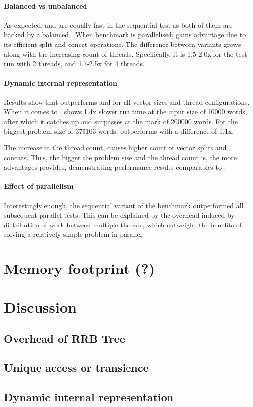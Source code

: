 \paragraph*{Balanced vs unbalanced}
As expected, \rbvec{} and \rrbvec{} are equally fast in the sequential test as both of them are backed by a balanced \rbtree{}. When benchmark is parallelised, \rrbvec{} gains advantage due to its efficient split and concat operations. The difference between variants grows along with the increasing count of threads. Specifically, it is 1.5-2.0x for the test run with 2 threads, and 1.7-2.5x for 4 threads.

\paragraph*{Dynamic internal representation}
Results show that \pvec{} outperforms \rbvec{} and \rrbvec{} for all vector sizes and thread configurations. When it comes to \stdvec{}, \pvec{} shows 1.4x slower run time at the input size of 10000 words, after which it catches up and surpasses \stdvec{} at the mark of 200000 words. For the biggest problem size of 370103 words, \pvec{} outperforms \stdvec{} with a difference of 1.1x. 

The increase in the thread count, causes higher count of vector splits and concats. Thus, the bigger the problem size and the thread count is, the more advantages \pvec{} provides, demonstrating performance results comparables to \stdvec{}. 

\paragraph*{Effect of parallelism}
Interestingly enough, the sequential variant of the benchmark outperformed all subsequent parallel tests. This can be explained by the overhead induced by distribution of work between multiple threads, which outweighs the benefits of solving a relatively simple problem in parallel.

\section{Memory footprint (?)}
\section{Discussion}
\subsection{Overhead of RRB Tree}
\subsection{Unique access or transience}
\subsection{Dynamic internal representation}

